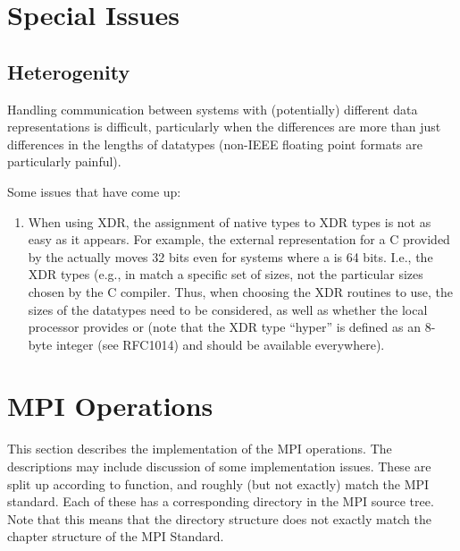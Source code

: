 \documentclass{article}
\begin{document}


\section{Special Issues}
\label{sec:special-issues}

\subsection{Heterogenity}
\label{sec:hetero-issues}

Handling communication between systems with (potentially) different data
representations is difficult, particularly when the differences are more than
just differences in the lengths of datatypes (non-IEEE floating point formats
are particularly painful).

Some issues that have come up:
\begin{enumerate}
\item When using XDR, the assignment of native types to XDR types
  is not as easy as it appears.  For example, the external representation for
  a C  provided by the  actually moves 32 bits
  even for systems where a  is 64 bits.  I.e., the XDR types (e.g.,
  in  match a specific set of sizes, not the particular sizes
  chosen by the C compiler.  Thus, when choosing the XDR routines to use, the
  sizes of the datatypes need to be considered, as well as whether the local
  processor provides  or  (note that the
  XDR type ``hyper'' is defined as an 8-byte integer (see RFC1014) and should
  be available everywhere).

\end{enumerate}

\section{MPI Operations}
\label{sec:mpi-operations}
This section describes the implementation of the MPI operations.  The
descriptions may include discussion of some implementation issues.
These are split up according to function, and roughly (but not
exactly) match the MPI standard.  Each of these has a corresponding
directory in the MPI source tree.  Note that this means that the
directory structure does not exactly match the chapter structure of
the MPI Standard.
\end{document}
